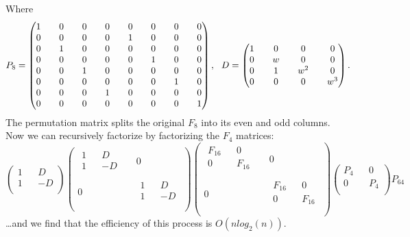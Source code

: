\documentclass[11pt]{article}
\begin{document}
Where
$$ \setcounter{MaxMatrixCols}{16}
   P_8=
   \begin{pmatrix}
   1 &&  0 && 0 && 0  && 0 && 0 && 0 && 0 \\
   0 && 0 && 0 && 0 && 1 && 0 && 0 && 0\\ 
   0 && 1 && 0 && 0 && 0 && 0 && 0 && 0\\
   0 && 0 && 0 && 0 && 0 && 1 && 0 && 0\\
   0 && 0 && 1 && 0 && 0 && 0 && 0 && 0\\
   0 && 0 && 0 && 0 && 0 && 0 && 1 && 0\\
   0 && 0 && 0 && 1 && 0 && 0 && 0 && 0\\
   0 && 0 && 0 && 0 && 0 && 0 && 0 && 1\\
 \end{pmatrix}, \, \,\,\,
 D=
  \begin{pmatrix}
   1 &&  0 && 0 && 0   \\
   0 && w && 0 && 0 \\ 
   0 && 1 && w^2 && 0\\
   0 && 0 && 0 && w^3 \\
 \end{pmatrix}.
 $$
 The permutation matrix splits the original $F_8$ into its even and odd columns. \\
Now we can recursively factorize by factorizing the $F_4$ matrices:
$$
\begin{pmatrix}
  1 && D\\
  1 && -D\\
 \end{pmatrix}
 \begin{pmatrix}
  \begin{matrix}1 && D\\ 1 && -D\\\end{matrix} && 0\\
  0 && \begin{matrix}1 && D\\ 1 && -D\\\end{matrix}\\
 \end{pmatrix} 
  \begin{pmatrix}
  \begin{matrix}F_{16} && 0\\ 0 && F_{16}\\\end{matrix} && 0\\
  0 && \begin{matrix}F_{16} && 0\\ 0 && F_{16}\\\end{matrix}\\
 \end{pmatrix} 
  \begin{pmatrix}
  P_4 && 0\\
  0 && P_4\\
 \end{pmatrix} 
 P_{64}
$$
\dots and 
we find that the efficiency of this process is $O(n log_2(n))$.
\end{document}
